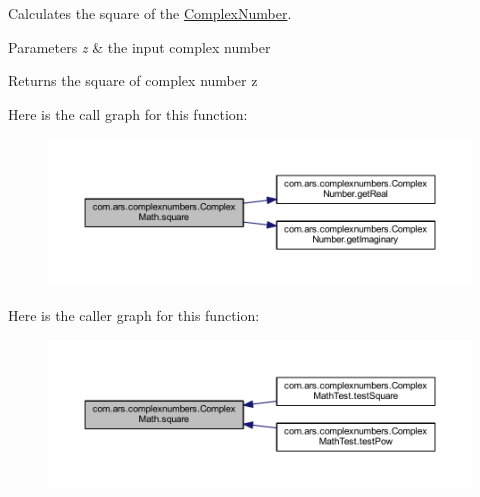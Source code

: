 Calculates the square of the {\ttfamily \hyperlink{classcom_1_1ars_1_1complexnumbers_1_1_complex_number}{Complex\+Number}}. 
\begin{DoxyParams}{Parameters}
{\em z} & the input complex number \\
\hline
\end{DoxyParams}
\begin{DoxyReturn}{Returns}
the square of complex number z 
\end{DoxyReturn}
Here is the call graph for this function\+:
\nopagebreak
\begin{figure}[H]
\begin{center}
\leavevmode
\includegraphics[width=350pt]{classcom_1_1ars_1_1complexnumbers_1_1_complex_math_ae8123eba1e8ecec75ed3d9fd05410ca2_cgraph}
\end{center}
\end{figure}
Here is the caller graph for this function\+:
\nopagebreak
\begin{figure}[H]
\begin{center}
\leavevmode
\includegraphics[width=350pt]{classcom_1_1ars_1_1complexnumbers_1_1_complex_math_ae8123eba1e8ecec75ed3d9fd05410ca2_icgraph}
\end{center}
\end{figure}
\hypertarget{classcom_1_1ars_1_1complexnumbers_1_1_complex_math_a2a8bfbcea23cec290cc91c8eeb9ab4fc}{}\label{classcom_1_1ars_1_1complexnumbers_1_1_complex_math_a2a8bfbcea23cec290cc91c8eeb9ab4fc} 
